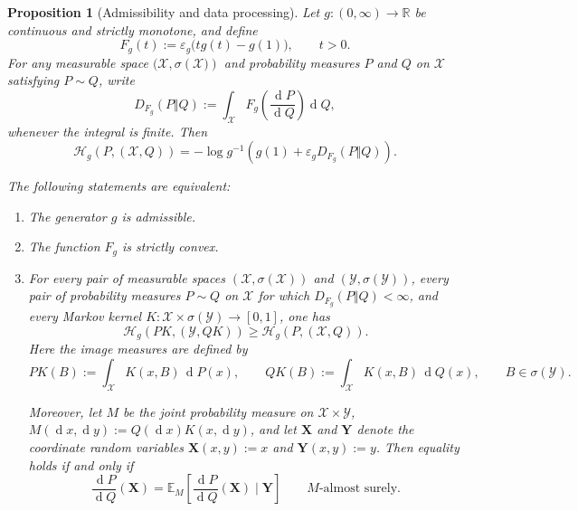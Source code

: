 \documentclass[10pt,a4paper]{amsart}
\def\dd{{\operatorname{d}}}
\newtheorem{prop}{Proposition}
\begin{document}
\begin{prop}[Admissibility and data processing]
\label{prop:data-processing}
Let $g:(0,\infty)\to\mathbb R$ be continuous and strictly monotone, and define
$$
F_g(t)
:=
\varepsilon_g\big(tg(t)-g(1)\big),
\qquad t>0.
$$
For any measurable space $(\mathcal{X},\sigma({\mathcal{X})})$ and probability
measures $P$ and $Q$ on $\mathcal X$ satisfying $P\sim Q$, write
$$
D_{F_g}(P\Vert Q)
:=
\int_{\mathcal X}
F_g\left(\frac{\dd P}{\dd Q}\right)\dd Q,
$$
whenever the integral is finite. Then
$$
\mathcal H_g(P,(\mathcal X,Q))
=
-\log g^{-1}
\left(
g(1)+\varepsilon_gD_{F_g}(P\Vert Q)
\right).
$$

The following statements are equivalent:
\begin{enumerate}
\item The generator $g$ is admissible.
\item The function $F_g$ is strictly convex.
\item For every pair of measurable spaces
$(\mathcal{X}, \sigma(\mathcal{X}))$ and $(\mathcal{Y},\sigma(\mathcal{Y}))$, every pair of probability measures $P\sim Q$ on $\mathcal X$ for which $D_{F_g}(P\Vert Q)<\infty$, and every Markov kernel $
K:\mathcal{X}\times\sigma(\mathcal{Y})\rightarrow[0,1]$,
one has
$$
\mathcal{H}_g(PK,(\mathcal{Y},QK))
\geq
\mathcal{H}_g(P,(\mathcal{X},Q)).
$$
Here the image measures are defined by
$$
PK(B):=\int_{\mathcal X}K(x,B)\,\dd P(x),
\qquad
QK(B):=\int_{\mathcal X}K(x,B)\,\dd Q(x),
\qquad B\in \sigma(\mathcal{Y}).
$$

Moreover, let $M$ be the joint probability measure on
$\mathcal X\times\mathcal Y$,  $
M(\dd x,\dd y):=Q(\dd x)K(x,\dd y)$,
and let $\mathbf X$ and $\mathbf Y$ denote the coordinate random
variables $\mathbf{X}(x,y):=x$
and $\mathbf{Y}(x,y):=y$.
Then equality holds if and only if
$$
\frac{\dd P}{\dd Q}(\mathbf X)
=
\mathbb E_M\!\left[\frac{\dd P}{\dd Q}(\mathbf X)\mid\mathbf Y\right]
\qquad M\text{-almost surely}.
$$

\end{enumerate}
\end{prop}
\end{document}
